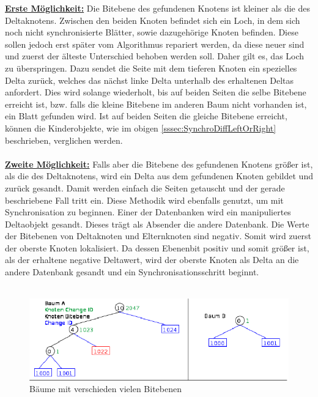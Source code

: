 \documentclass[a4paper,11pt,oneside,%
headsepline,												%
footsepline,												%
bibtotocnumbered									%
]{scrreprt}
\begin{document}
\underline{{\bf Erste Möglichkeit:}} Die Bitebene des gefundenen Knotens ist kleiner als die des Deltaknotens. Zwischen den beiden Knoten befindet sich ein Loch, in dem sich noch nicht synchronisierte Blätter, sowie dazugehörige Knoten befinden. Diese sollen jedoch erst später vom Algorithmus repariert werden, da diese neuer sind und zuerst der älteste Unterschied behoben werden soll. Daher gilt es, das Loch zu überspringen. Dazu sendet die Seite mit dem tieferen Knoten ein spezielles Delta zurück, welches das nächst linke Delta unterhalb des erhaltenen Deltas anfordert. Dies wird solange wiederholt, bis auf beiden Seiten die selbe Bitebene erreicht ist, bzw. falls die kleine Bitebene im anderen Baum nicht vorhanden ist, ein Blatt gefunden wird. Ist auf beiden Seiten die gleiche Bitebene erreicht, können die Kinderobjekte, wie im obigen \autoref{sssec:SynchroDiffLeftOrRight} beschrieben, verglichen werden.\\\\
\underline{{\bf Zweite Möglichkeit:}} Falls aber die Bitebene des gefundenen Knotens größer ist, als die des Deltaknotens, wird ein Delta aus dem gefundenen Knoten gebildet und zurück gesandt. Damit werden einfach die Seiten getauscht und der gerade beschriebene Fall tritt ein. Diese Methodik wird ebenfalls genutzt, um mit Synchronisation zu beginnen. Einer der Datenbanken wird ein manipuliertes Deltaobjekt gesandt. Dieses trägt als Absender die andere Datenbank. Die Werte der Bitebenen von Deltaknoten und Elternknoten sind negativ. Somit wird zuerst der oberste Knoten lokalisiert. Da dessen Ebenenbit positiv und somit größer ist, als der erhaltene negative Deltawert, wird der oberste Knoten als Delta an die andere Datenbank gesandt und ein Synchronisationsschritt beginnt. \\\\
\begin{figure}[h!]
  \begin{center}
    \includegraphics[width=0.9\linewidth]{bilder/case 2 A B1.png}
  \end{center}
 \caption{Bäume mit verschieden vielen Bitebenen}
\end{figure}
\end{document}
